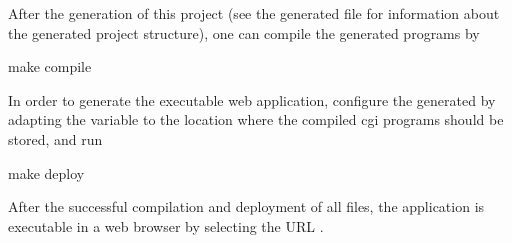 After the generation of this project (see the generated file
 for information about the generated project structure),
one can compile the generated programs by
\begin{curry}
make compile
\end{curry}
In order to generate the executable web application,
configure the generated 
by adapting the variable  to the location
where the compiled cgi programs should be stored, and run
\begin{curry}
make deploy
\end{curry}
After the successful compilation and deployment of all files,
the application is executable
in a web browser by selecting the URL .

